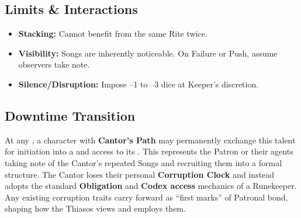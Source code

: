 \subsection*{Limits \& Interactions}
\begin{itemize}
  \item \textbf{Stacking:} Cannot benefit from the same Rite twice.
  \item \textbf{Visibility:} Songs are inherently noticeable. On Failure or Push, assume observers take note.
  \item \textbf{Silence/Disruption:} Impose –1 to –3 dice at Keeper’s discretion.
\end{itemize}

\subsection*{Downtime Transition}
At any , a character with \textbf{Cantor’s Path} may permanently exchange this talent for initiation into a  and access to its . This represents the Patron or their agents taking note of the Cantor’s repeated Songs and recruiting them into a formal structure. The Cantor loses their personal \textbf{Corruption Clock} and instead adopts the standard \textbf{Obligation} and \textbf{Codex access} mechanics of a Runekeeper. Any existing corruption traits carry forward as “first marks” of Patronal bond, shaping how the Thiasos views and employs them.